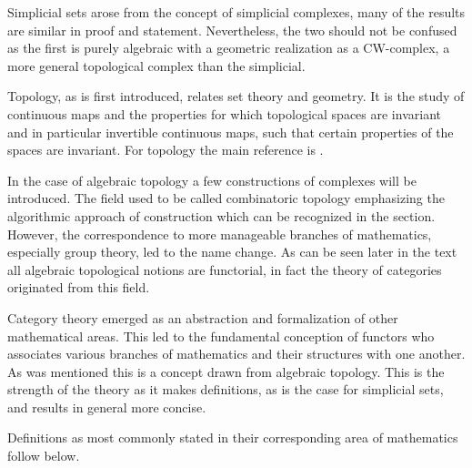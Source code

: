 \documentclass[../../main.tex]{subfiles}
\begin{document}
    Simplicial sets arose from the concept of simplicial complexes, many of the results are similar in proof and statement. Nevertheless, the two should not be confused as the first is purely algebraic with a geometric realization as a CW-complex, a more general topological complex than the simplicial. 
    
    Topology, as is first introduced, relates set theory and geometry. It is the study of continuous maps and the properties for which topological spaces are invariant and in particular invertible continuous maps, such that certain properties of the spaces are invariant. For topology the main reference is \cite{armstrong-basictop}.
    
    In the case of algebraic topology a few constructions of complexes will be introduced. The field used to be called combinatoric topology emphasizing the algorithmic approach of construction which can be recognized in the section. However, the correspondence to more manageable branches of mathematics, especially group theory, led to the name change. As can be seen later in the text all algebraic topological notions are functorial, in fact the theory of categories originated from this field. 
    
    Category theory emerged as an abstraction and formalization of other mathematical areas. This led to the fundamental conception of functors who associates various branches of mathematics and their structures with one another. As was mentioned this is a concept drawn from algebraic topology. This is the strength of the theory as it makes definitions, as is the case for simplicial sets, and results in general more concise. 
    
    Definitions as most commonly stated in their corresponding area of mathematics follow below. 
    
\end{document}
